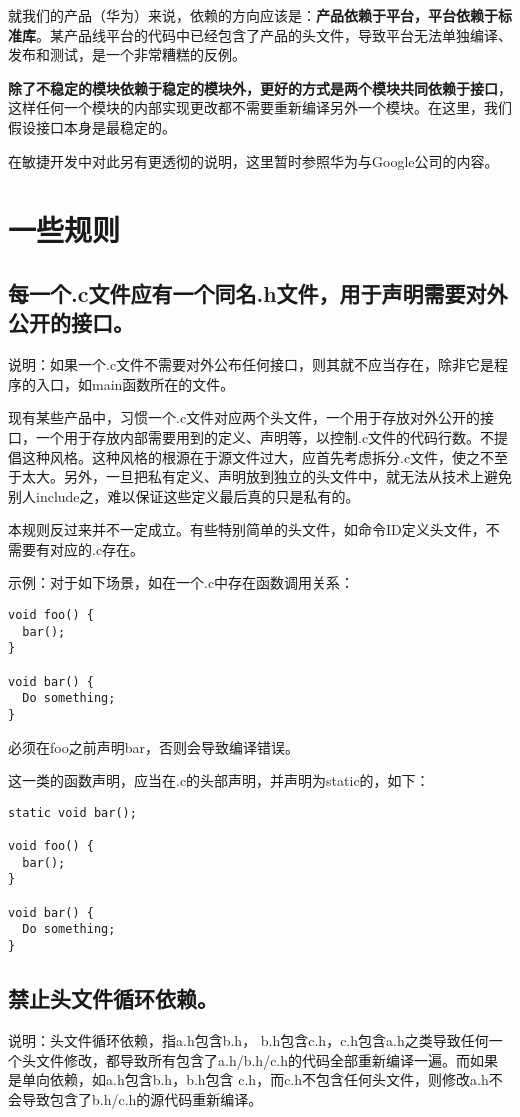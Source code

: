 就我们的产品（华为）来说，依赖的方向应该是：\textbf{产品依赖于平台，平台依赖于标准库}。某产品线平台的代码中已经包含了产品的头文件，导致平台无法单独编译、发布和测试，是一个非常糟糕的反例。

\textbf{除了不稳定的模块依赖于稳定的模块外，更好的方式是两个模块共同依赖于接口}，这样任何一个模块的内部实现更改都不需要重新编译另外一个模块。在这里，我们假设接口本身是最稳定的。

在敏捷开发中对此另有更透彻的说明，这里暂时参照华为与Google公司的内容。


\section{一些规则}

\subsection{每一个.c文件应有一个同名.h文件，用于声明需要对外公开的接口。}
说明：如果一个.c文件不需要对外公布任何接口，则其就不应当存在，除非它是程序的入口，如main函数所在的文件。

现有某些产品中，习惯一个.c文件对应两个头文件，一个用于存放对外公开的接口，一个用于存放内部需要用到的定义、声明等，以控制.c文件的代码行数。不提倡这种风格。这种风格的根源在于源文件过大，应首先考虑拆分.c文件，使之不至于太大。另外，一旦把私有定义、声明放到独立的头文件中，就无法从技术上避免别人include之，难以保证这些定义最后真的只是私有的。

本规则反过来并不一定成立。有些特别简单的头文件，如命令ID定义头文件，不需要有对应的.c存在。

示例：对于如下场景，如在一个.c中存在函数调用关系：
\begin{verbatim}
void foo() {
  bar();
}

void bar() {
  Do something;
}
\end{verbatim}

必须在foo之前声明bar，否则会导致编译错误。

这一类的函数声明，应当在.c的头部声明，并声明为static的，如下：
\begin{verbatim}
static void bar();

void foo() {
  bar();
}

void bar() {
  Do something;
}
\end{verbatim}


\subsection{禁止头文件循环依赖。}
说明：头文件循环依赖，指a.h包含b.h， b.h包含c.h，c.h包含a.h之类导致任何一个头文件修改，都导致所有包含了a.h/b.h/c.h的代码全部重新编译一遍。而如果是单向依赖，如a.h包含b.h，b.h包含
c.h，而c.h不包含任何头文件，则修改a.h不会导致包含了b.h/c.h的源代码重新编译。


